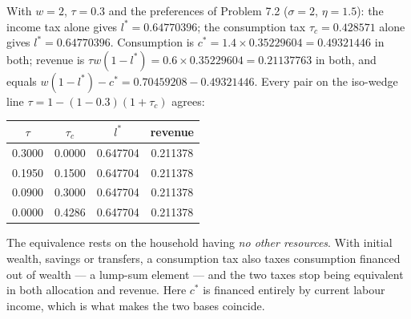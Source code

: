 \documentclass[12pt, letterpaper]{article}
\begin{document}
\begin{tcolorbox}[oddbox,title={Problem 7.3 \quad Consumption Taxes and Labor Supply}]
\begin{tcolorbox}[databox]
With $w=2$, $\tau=0.3$ and the preferences of Problem 7.2 ($\sigma=2$, $\eta=1.5$): the
income tax alone gives $l^*=0.64770396$; the consumption tax $\tau_c=0.428571$ alone gives
$l^*=0.64770396$. Consumption is $c^*=1.4\times0.35229604=0.49321446$ in both; revenue is
$\tau w(1-l^*)=0.6\times0.35229604=0.21137763$ in both, and equals
$w(1-l^*)-c^*=0.70459208-0.49321446$. Every pair on the iso-wedge line
$\tau=1-(1-0.3)(1+\tau_c)$ agrees:

\begin{center}
\begin{tabular}{@{}cccc@{}}
\toprule
$\tau$ & $\tau_c$ & $l^*$ & revenue\\
\midrule
0.3000 & 0.0000 & 0.647704 & 0.211378\\
0.1950 & 0.1500 & 0.647704 & 0.211378\\
0.0900 & 0.3000 & 0.647704 & 0.211378\\
0.0000 & 0.4286 & 0.647704 & 0.211378\\
\bottomrule
\end{tabular}
\end{center}
\end{tcolorbox}

\begin{tcolorbox}[trapbox]
The equivalence rests on the household having \emph{no other resources}. With initial wealth,
savings or transfers, a consumption tax also taxes consumption financed out of wealth ---
a lump-sum element --- and the two taxes stop being equivalent in both allocation and
revenue. Here $c^*$ is financed entirely by current labour income, which is what makes the
two bases coincide.
\end{tcolorbox}
\end{tcolorbox}
\end{document}
